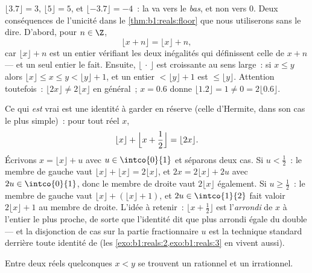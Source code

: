 \begin{example}\label{ex:b1:reals:floorpractice}
$\lfloor 3.7 \rfloor = 3$, $\lfloor 5 \rfloor = 5$, et $\lfloor
-3.7 \rfloor = -4$~: la  va vers le \emph{bas}, et
non vers $0$. Deux conséquences de l'unicité dans le
\cref{thm:b1:reals:floor} que nous utiliserons sans le dire.
D'abord, pour $n \in \Z$,
\[
\lfloor x + n \rfloor = \lfloor x \rfloor + n ,
\]
car $\lfloor x \rfloor + n$ est un entier vérifiant les deux
inégalités qui définissent celle de $x + n$ --- et un seul entier
le fait. Ensuite, $\lfloor \, \cdot \, \rfloor$ est croissante au
sens large~: si $x \leq y$ alors $\lfloor x \rfloor \leq x \leq y <
\lfloor y \rfloor + 1$, et un entier $< \lfloor y \rfloor + 1$ est
$\leq \lfloor y \rfloor$. Attention toutefois~: $\lfloor 2x \rfloor
\neq 2\lfloor x \rfloor$ en général~; $x = 0.6$ donne $\lfloor 1.2
\rfloor = 1 \neq 0 = 2\lfloor 0.6 \rfloor$.

Ce qui \emph{est} vrai est une identité à garder en réserve (celle
d'Hermite, dans son cas le plus simple)~: pour tout réel $x$,
\[
\lfloor x \rfloor + \Bigl\lfloor x + \frac12 \Bigr\rfloor
= \lfloor 2x \rfloor .
\]
Écrivons $x = \lfloor x\rfloor + u$ avec $u \in \intco{0}{1}$ et
séparons deux cas. Si $u < \frac12$~: le membre de gauche vaut
$\lfloor x\rfloor + \lfloor x\rfloor = 2\lfloor x\rfloor$, et $2x =
2\lfloor x\rfloor + 2u$ avec $2u \in \intco{0}{1}$, donc le membre
de droite vaut $2\lfloor x\rfloor$ également. Si $u \geq \frac12$~:
le membre de gauche vaut $\lfloor x\rfloor + (\lfloor x\rfloor +
1)$, et $2u \in \intco{1}{2}$ fait valoir $2\lfloor x\rfloor + 1$ au
membre de droite. L'idée à retenir~: $\lfloor x + \frac12\rfloor$
est l'\emph{arrondi} de $x$ à l'entier le plus proche, de sorte que
l'identité dit que  plus arrondi égale 
du double --- et la disjonction de cas sur la partie fractionnaire
$u$ est la technique standard derrière toute identité de  (les \cref{exo:b1:reals:2,exo:b1:reals:3} en vivent aussi).
\end{example}

\begin{theorem}\label{thm:b1:reals:density}
Entre deux réels quelconques $x < y$ se trouvent un rationnel et un
irrationnel.
\end{theorem}

